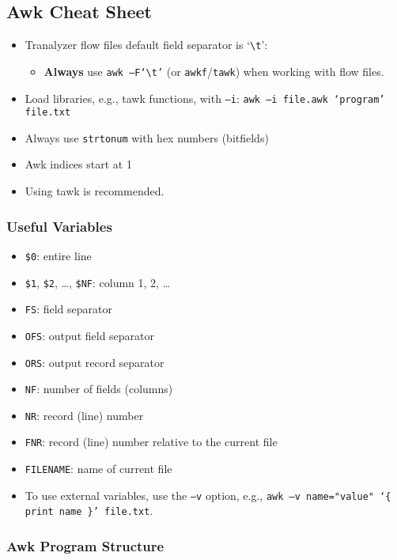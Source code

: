 \documentclass[documentation]{subfiles}
\begin{document}
\subsection{Awk Cheat Sheet}
\begin{itemize}
    \item Tranalyzer flow files default field separator is `{\tt \textbackslash{}t}':
    \begin{itemize}
        \item {\bf Always} use {\tt awk --F`\textbackslash{}t'} (or {\tt awkf}/{\tt tawk}) when working with flow files.
    \end{itemize}
\item Load libraries, e.g., tawk functions, with {\tt --i}: {\tt awk --i file.awk `program' file.txt}
    \item Always use {\tt strtonum} with hex numbers (bitfields)
    \item Awk indices start at 1
    \item Using tawk is recommended.
\end{itemize}

\subsubsection{Useful Variables}
\begin{itemize}
    \item {\tt \$0}: entire line
    \item {\tt \$1}, {\tt \$2}, \ldots, {\tt \$NF}: column 1, 2, \ldots
    \item {\tt FS}: field separator
    \item {\tt OFS}: output field separator
    \item {\tt ORS}: output record separator
    \item {\tt NF}: number of fields (columns)
    \item {\tt NR}: record (line) number
    \item {\tt FNR}: record (line) number relative to the current file
    \item {\tt FILENAME}: name of current file
    \item To use external variables, use the {\tt --v} option, e.g., {\tt awk --v name="value" `\{ print name \}' file.txt}.
\end{itemize}

\subsubsection{Awk Program Structure}
\end{document}
